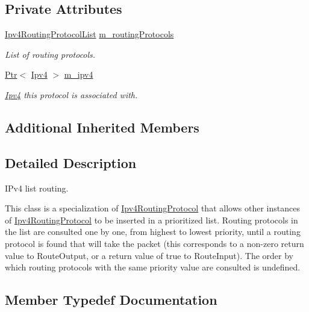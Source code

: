 \subsection*{Private Attributes}
\begin{DoxyCompactItemize}
\item 
\hyperlink{classns3_1_1Ipv4ListRouting_a895846238dc31be02086e45f9296f8dc}{Ipv4\+Routing\+Protocol\+List} \hyperlink{classns3_1_1Ipv4ListRouting_a49de17cac4bf72e28b064bff3a93d29d}{m\+\_\+routing\+Protocols}
\begin{DoxyCompactList}\small\item\em List of routing protocols. \end{DoxyCompactList}\item 
\hyperlink{classns3_1_1Ptr}{Ptr}$<$ \hyperlink{classns3_1_1Ipv4}{Ipv4} $>$ \hyperlink{classns3_1_1Ipv4ListRouting_aaf41416278c236de8b12028f91a40106}{m\+\_\+ipv4}
\begin{DoxyCompactList}\small\item\em \hyperlink{classns3_1_1Ipv4}{Ipv4} this protocol is associated with. \end{DoxyCompactList}\end{DoxyCompactItemize}
\subsection*{Additional Inherited Members}


\subsection{Detailed Description}
I\+Pv4 list routing. 

This class is a specialization of \hyperlink{classns3_1_1Ipv4RoutingProtocol}{Ipv4\+Routing\+Protocol} that allows other instances of \hyperlink{classns3_1_1Ipv4RoutingProtocol}{Ipv4\+Routing\+Protocol} to be inserted in a prioritized list. Routing protocols in the list are consulted one by one, from highest to lowest priority, until a routing protocol is found that will take the packet (this corresponds to a non-\/zero return value to Route\+Output, or a return value of true to Route\+Input). The order by which routing protocols with the same priority value are consulted is undefined. 

\subsection{Member Typedef Documentation}
